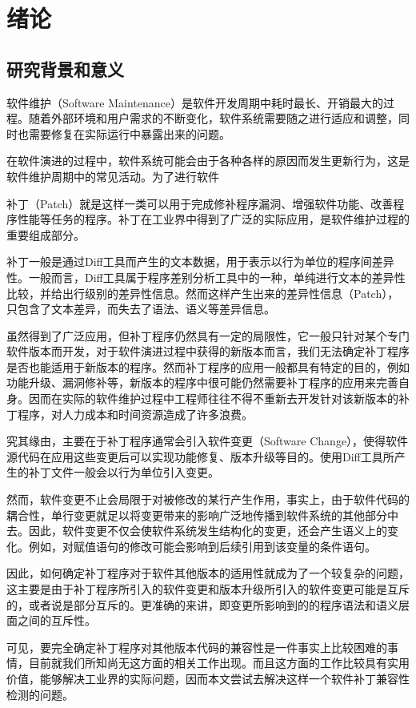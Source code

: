 \chapter{绪论}
\section{研究背景和意义}

软件维护（Software Maintenance）是软件开发周期中耗时最长、开销最大的过程。随着外部环境和用户需求的不断变化，软件系统需要随之进行适应和调整，同时也需要修复在实际运行中暴露出来的问题。

在软件演进的过程中，软件系统可能会由于各种各样的原因而发生更新行为，这是软件维护周期中的常见活动。为了进行软件

补丁（Patch）就是这样一类可以用于完成修补程序漏洞、增强软件功能、改善程序性能等任务的程序。补丁在工业界中得到了广泛的实际应用，是软件维护过程的重要组成部分。

补丁一般是通过Diff工具而产生的文本数据，用于表示以行为单位的程序间差异性。一般而言，Diff工具属于程序差别分析工具中的一种，单纯进行文本的差异性比较，并给出行级别的差异性信息。然而这样产生出来的差异性信息（Patch），只包含了文本差异，而失去了语法、语义等差异信息。

虽然得到了广泛应用，但补丁程序仍然具有一定的局限性，它一般只针对某个专门软件版本而开发，对于软件演进过程中获得的新版本而言，我们无法确定补丁程序是否也能适用于新版本的程序。然而补丁程序的应用一般都具有特定的目的，例如功能升级、漏洞修补等，新版本的程序中很可能仍然需要补丁程序的应用来完善自身。因而在实际的软件维护过程中工程师往往不得不重新去开发针对该新版本的补丁程序，对人力成本和时间资源造成了许多浪费。

究其缘由，主要在于补丁程序通常会引入软件变更（Software Change），使得软件源代码在应用这些变更后可以实现功能修复、版本升级等目的。使用Diff工具所产生的补丁文件一般会以行为单位引入变更。

然而，软件变更不止会局限于对被修改的某行产生作用，事实上，由于软件代码的耦合性，单行变更就足以将变更带来的影响广泛地传播到软件系统的其他部分中去。因此，软件变更不仅会使软件系统发生结构化的变更，还会产生语义上的变化。例如，对赋值语句的修改可能会影响到后续引用到该变量的条件语句。

因此，如何确定补丁程序对于软件其他版本的适用性就成为了一个较复杂的问题，这主要是由于补丁程序所引入的软件变更和版本升级所引入的软件变更可能是互斥的，或者说是部分互斥的。更准确的来讲，即变更所影响到的的程序语法和语义层面之间的互斥性。

可见，要完全确定补丁程序对其他版本代码的兼容性是一件事实上比较困难的事情，目前就我们所知尚无这方面的相关工作出现。而且这方面的工作比较具有实用价值，能够解决工业界的实际问题，因而本文尝试去解决这样一个软件补丁兼容性检测的问题。

